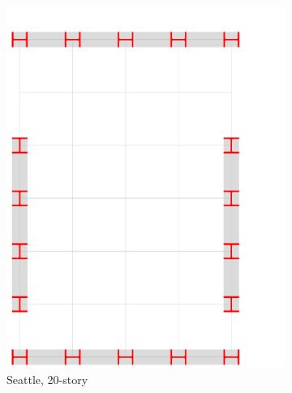 \documentclass{simcenterdocumentation}
\begin{document}
\begin{figure}[H]
\begin{subfigure}[b]{0.24\linewidth}
		\centering \includegraphics[page=2,trim=0mm 0mm 90mm 100mm,clip,scale=0.2]{moment_frames.pdf}
		\caption{Seattle, 20-story}
	\end{subfigure}
	\begin{subfigure}[b]{0.24\linewidth}

\end{subfigure}
\end{figure}
\end{document}
